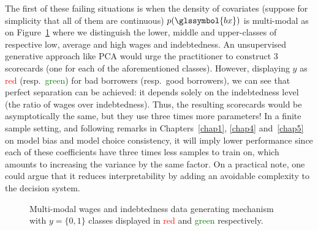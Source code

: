 The first of these failing situations is when the density of covariates (suppose for simplicity that all of them are continuous) $p(\glssymbol{bx})$ is multi-modal as on Figure~\ref{fig:xdiff} where we distinguish the lower, middle and upper-classes of respective low, average and high wages and indebtedness. An unsupervised generative approach like PCA would urge the practitioner to construct 3 scorecards (one for each of the aforementioned classes). However, displaying $y$ as \textcolor{red}{red} (resp.\ \textcolor{green}{green}) for bad borrowers (resp.\ good borrowers), we can see that perfect separation can be achieved: it depends solely on the indebtedness level (the ratio of wages over indebtedness). Thus, the resulting scorecards would be asymptotically the same, but they use three times more parameters! In a finite sample setting, and following remarks in Chapters~\ref{chap1}, \ref{chap4} and~\ref{chap5} on model bias and model choice consistency, it will imply lower performance since each of these coefficients have three times less samples to train on, which amounts to increasing the variance by the same factor. On a practical note, one could argue that it reduces interpretability by adding an avoidable complexity to the decision system.


\begin{figure}
\centering
{}
\caption{\label{fig:xdiff} Multi-modal wages and indebtedness data generating mechanism with $y = \{0,1\}$ classes displayed in \textcolor{red}{red} and \textcolor{green}{green} respectively.}
\end{figure}


